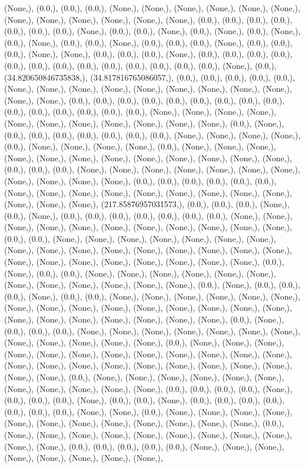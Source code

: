 \documentclass{article}
\begin{document}
(None,), (0.0,), (0.0,), (0.0,), (None,), (None,), (None,), (None,), (None,), (None,), (None,), (None,), (None,), (None,), (None,), (None,), (0.0,), (0.0,), (0.0,), (0.0,), (0.0,), (0.0,), (0.0,), (None,), (0.0,), (0.0,), (None,), (0.0,), (None,), (0.0,), (None,), (0.0,), (None,), (0.0,), (0.0,), (None,), (0.0,), (0.0,), (0.0,), (None,), (0.0,), (0.0,), (0.0,), (None,), (None,), (0.0,), (0.0,), (0.0,), (None,), (0.0,), (0.0,), (0.0,), (0.0,), (0.0,), (0.0,), (0.0,), (0.0,), (0.0,), (0.0,), (0.0,), (0.0,), (0.0,), (None,), (0.0,), (34.820650846735838,), (34.817816765086057,), (0.0,), (0.0,), (0.0,), (0.0,), (0.0,), (None,), (None,), (None,), (None,), (None,), (None,), (None,), (None,), (None,), (None,), (None,), (0.0,), (0.0,), (0.0,), (0.0,), (0.0,), (0.0,), (0.0,), (0.0,), (0.0,), (0.0,), (0.0,), (0.0,), (0.0,), (0.0,), (0.0,), (None,), (None,), (None,), (None,), (None,), (None,), (None,), (None,), (None,), (None,), (None,), (0.0,), (None,), (0.0,), (0.0,), (0.0,), (0.0,), (0.0,), (0.0,), (0.0,), (None,), (None,), (None,), (None,), (0.0,), (None,), (None,), (None,), (None,), (0.0,), (None,), (None,), (None,), (None,), (None,), (None,), (None,), (None,), (None,), (None,), (None,), (None,), (0.0,), (0.0,), (0.0,), (None,), (None,), (None,), (None,), (None,), (None,), (None,), (None,), (None,), (None,), (None,), (0.0,), (0.0,), (0.0,), (0.0,), (0.0,), (0.0,), (None,), (None,), (None,), (None,), (None,), (None,), (None,), (None,), (None,), (None,), (None,), (None,), (217.85876957031573,), (0.0,), (0.0,), (0.0,), (None,), (0.0,), (None,), (0.0,), (0.0,), (0.0,), (0.0,), (0.0,), (0.0,), (0.0,), (None,), (None,), (None,), (None,), (None,), (None,), (None,), (None,), (None,), (None,), (None,), (0.0,), (0.0,), (None,), (None,), (None,), (None,), (None,), (None,), (None,), (None,), (None,), (None,), (None,), (None,), (None,), (None,), (None,), (None,), (None,), (None,), (None,), (None,), (None,), (None,), (None,), (None,), (0.0,), (None,), (0.0,), (0.0,), (None,), (None,), (None,), (None,), (None,), (None,), (None,), (None,), (None,), (None,), (None,), (None,), (0.0,), (None,), (0.0,), (0.0,), (0.0,), (None,), (0.0,), (0.0,), (None,), (None,), (None,), (None,), (None,), (None,), (None,), (None,), (None,), (None,), (None,), (None,), (None,), (None,), (None,), (None,), (None,), (None,), (None,), (None,), (None,), (None,), (0.0,), (None,), (0.0,), (0.0,), (0.0,), (None,), (None,), (None,), (None,), (None,), (None,), (None,), (None,), (None,), (None,), (None,), (None,), (0.0,), (None,), (None,), (None,), (None,), (None,), (None,), (None,), (None,), (None,), (None,), (None,), (None,), (None,), (None,), (None,), (None,), (None,), (None,), (None,), (None,), (None,), (None,), (None,), (0.0,), (None,), (None,), (None,), (None,), (None,), (None,), (None,), (None,), (None,), (None,), (None,), (0.0,), (0.0,), (0.0,), (0.0,), (None,), (0.0,), (0.0,), (0.0,), (None,), (0.0,), (0.0,), (None,), (0.0,), (0.0,), (0.0,), (0.0,), (0.0,), (0.0,), (0.0,), (None,), (None,), (0.0,), (None,), (None,), (None,), (None,), (None,), (None,), (None,), (None,), (None,), (None,), (None,), (None,), (0.0,), (None,), (None,), (None,), (None,), (None,), (None,), (None,), (None,), (None,), (None,), (None,), (0.0,), (0.0,), (0.0,), (0.0,), (0.0,), (None,), (None,), (None,), (None,), (None,), (None,), (None,), (None,), 
\end{document}
